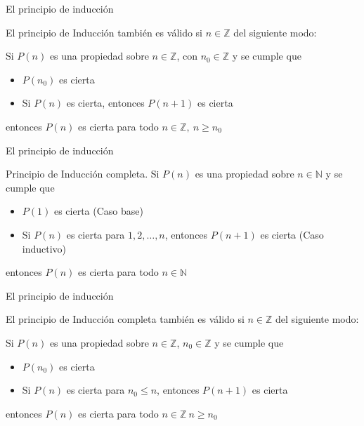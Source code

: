 \documentclass[
  ignorenonframetext,
]{beamer}
\providecommand{\tightlist}{%
  \setlength{\itemsep}{0pt}\setlength{\parskip}{0pt}}
\begin{document}
\begin{frame}{El principio de inducción}
\protect\hypertarget{el-principio-de-inducciuxf3n-2}{}

El principio de Inducción también es válido si \(n\in\mathbb{Z}\) del
siguiente modo:

Si \(P(n)\) es una propiedad sobre \(n\in\mathbb{Z}\), con
\(n_0\in\mathbb{Z}\) y se cumple que

\begin{itemize}
\tightlist
\item
  \(P(n_0)\) es cierta
\item
  Si \(P(n)\) es cierta, entonces \(P(n+1)\) es cierta
\end{itemize}

entonces \(P(n)\) es cierta para todo \(n\in\mathbb{Z},\ n\ge n_0\)

\end{frame}

\begin{frame}{El principio de inducción}
\protect\hypertarget{el-principio-de-inducciuxf3n-3}{}

Principio de Inducción completa. Si \(P(n)\) es una propiedad sobre
\(n\in\mathbb{N}\) y se cumple que

\begin{itemize}
\tightlist
\item
  \(P(1)\) es cierta (Caso base)
\item
  Si \(P(n)\) es cierta para \(1,2,\dots, n\), entonces \(P(n+1)\) es
  cierta (Caso inductivo)
\end{itemize}

entonces \(P(n)\) es cierta para todo \(n\in\mathbb{N}\)

\end{frame}

\begin{frame}{El principio de inducción}
\protect\hypertarget{el-principio-de-inducciuxf3n-4}{}

El principio de Inducción completa también es válido si
\(n\in\mathbb{Z}\) del siguiente modo:

Si \(P(n)\) es una propiedad sobre \(n\in\mathbb{Z}\),
\(n_0\in\mathbb{Z}\) y se cumple que

\begin{itemize}
\tightlist
\item
  \(P(n_0)\) es cierta
\item
  Si \(P(n)\) es cierta para \(n_0\le n\), entonces \(P(n+1)\) es cierta
\end{itemize}

entonces \(P(n)\) es cierta para todo \(n\in\mathbb{Z}\ n\ge n_0\)

\end{frame}
\end{document}
